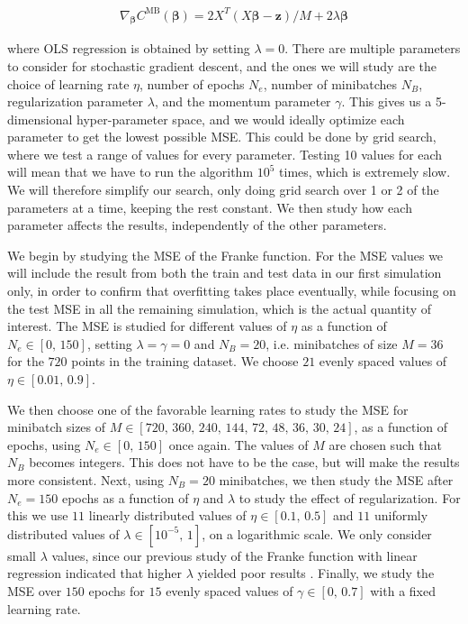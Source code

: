\documentclass[12pt]{extarticle}
\begin{document}
\begin{align} \label{eq:SGD_gradient}
	\nabla_{\boldsymbol{\beta}}C^\mathrm{MB} (\boldsymbol{\beta})=2 X^T (X \boldsymbol{\beta} - \boldsymbol{z})/M + 2\lambda\boldsymbol{\beta}
\end{align}

where OLS regression is obtained by setting $\lambda=0$. There are multiple parameters to consider for stochastic gradient descent, and the ones we will study are the choice of learning rate $\eta$, number of epochs $N_e$, number of minibatches $N_B$, regularization parameter $\lambda$, and the momentum parameter $\gamma$. This gives us a 5-dimensional hyper-parameter space, and we would ideally optimize each parameter to get the lowest possible MSE. This could be done by grid search, where we test a range of values for every parameter. Testing 10 values for each will mean that we have to run the algorithm $10^5$ times, which is extremely slow. We will therefore simplify our search, only doing grid search over 1 or 2 of the parameters at a time, keeping the rest constant. We then study how each parameter affects the results, independently of the other parameters.


We begin by studying the MSE of the Franke function. For the MSE values we will include the result from both the train and test data in our first simulation only, in order to confirm that overfitting takes place eventually, while focusing on the test MSE in all the remaining simulation, which is the actual quantity of interest. The MSE is studied for different values of $\eta$ as a function of $N_e\in[0,\,150]$, setting $\lambda=\gamma=0$ and $N_B=20$, i.e. minibatches of size $M=36$ for the $720$ points in the training dataset. We choose $21$ evenly spaced values of $\eta\in[0.01,\,0.9]$.

We then choose one of the favorable learning rates to study the MSE for minibatch sizes of $M\in[720,\,360,\,240,\,144,\,72,\,48,\,36,\,30,\,24]$, as a function of epochs, using $N_e\in[0,\,150]$ once again. The values of $M$ are chosen such that $N_B$ becomes integers. This does not have to be the case, but will make the results more consistent. Next, using $N_B=20$ minibatches, we then study the MSE after $N_e=150$ epochs as a function of $\eta$ and $\lambda$ to study the effect of regularization. For this we use $11$ linearly distributed values of $\eta\in[0.1,\,0.5]$ and $11$ uniformly distributed values of $\lambda\in[10^{-5},\,1]$, on a logarithmic scale. We only consider small $\lambda$ values, since our previous study of the Franke function with linear regression indicated that higher $\lambda$ yielded poor results \cite{project1}. Finally, we study the MSE over $150$ epochs for $15$ evenly spaced values of $\gamma\in[0,\,0.7]$ with a fixed learning rate.
\end{document}
